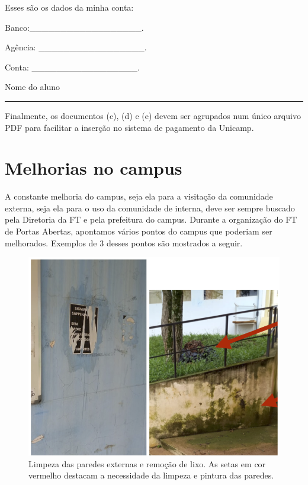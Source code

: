 \documentclass[
  letterpaper,
  DIV=11,
  numbers=noendperiod]{scrreprt}
\begin{document}
Esses são os dados da minha conta:

Banco:\_\_\_\_\_\_\_\_\_\_\_\_\_\_\_\_\_\_.

Agência: \_\_\_\_\_\_\_\_\_\_\_\_\_\_\_\_\_.

Conta: \_\_\_\_\_\_\_\_\_\_\_\_\_\_\_\_\_.

Nome do aluno

\begin{center}\rule{0.5\linewidth}{0.5pt}\end{center}

Finalmente, os documentos (c), (d) e (e) devem ser agrupados num único
arquivo PDF para facilitar a inserção no sistema de pagamento da
Unicamp.

\section{Melhorias no campus}\label{melhorias-no-campus}

A constante melhoria do campus, seja ela para a visitação da comunidade
externa, seja ela para o uso da comunidade de interna, deve ser sempre
buscado pela Diretoria da FT e pela prefeitura do campus. Durante a
organização do FT de Portas Abertas, apontamos vários pontos do campus
que poderiam ser melhorados. Exemplos de 3 desses pontos são mostrados a
seguir.

\begin{figure}[H]

{\centering \includegraphics[width=0.6\linewidth,height=\textheight,keepaspectratio]{recomendacoes/melhoria-1.png}

}

\caption{Limpeza das paredes externas e remoção de lixo. As setas em cor
vermelho destacam a necessidade da limpeza e pintura das paredes.}

\end{figure}%
\end{document}
